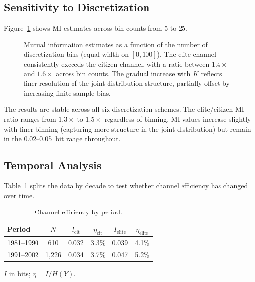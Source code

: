 \documentclass[twocolumn,10pt]{article}
\begin{document}
\subsection{Sensitivity to Discretization}

Figure~\ref{fig:sensitivity} shows MI estimates across bin counts from 5 to 25.

\begin{figure}[t]
\centering
{}
\caption{Mutual information estimates as a function of the number of discretization bins (equal-width on $[0, 100]$).  The elite channel consistently exceeds the citizen channel, with a ratio between $1.4\times$ and $1.6\times$ across bin counts.  The gradual increase with $K$ reflects finer resolution of the joint distribution structure, partially offset by increasing finite-sample bias.}
\label{fig:sensitivity}
\end{figure}

The results are stable across all six discretization schemes.  The elite/citizen MI ratio ranges from $1.3\times$ to $1.5\times$ regardless of binning.  MI values increase slightly with finer binning (capturing more structure in the joint distribution) but remain in the 0.02--0.05~bit range throughout.

\subsection{Temporal Analysis}

Table~\ref{tab:temporal} splits the data by decade to test whether channel efficiency has changed over time.

\begin{table}[t]
\centering
\caption{Channel efficiency by period.}
\label{tab:temporal}
\begin{tabular}{@{}lccccc@{}}
\toprule
Period & $N$ & $I_\text{cit}$ & $\eta_\text{cit}$ & $I_\text{elite}$ & $\eta_\text{elite}$ \\
\midrule
1981--1990 & 610 & 0.032 & 3.3\% & 0.039 & 4.1\% \\
1991--2002 & 1,226 & 0.034 & 3.7\% & 0.047 & 5.2\% \\
\bottomrule
\end{tabular}
\smallskip

\footnotesize{$I$ in bits; $\eta = I/H(Y)$.}
\end{table}
\end{document}
